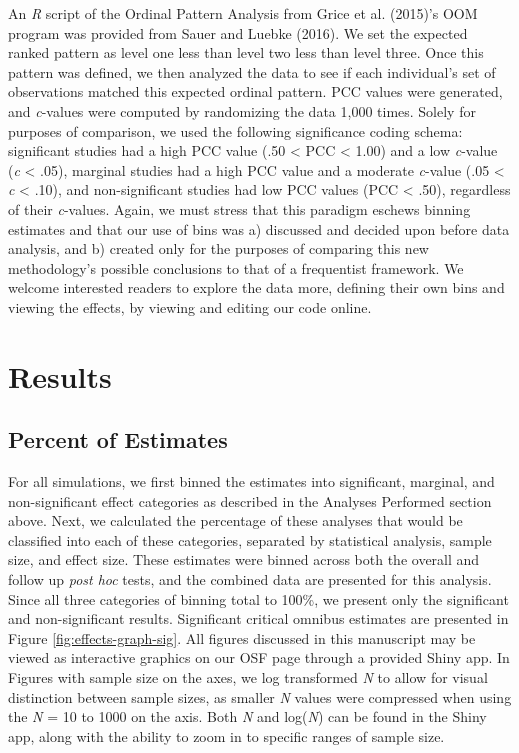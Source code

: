 \documentclass[,man, mask]{apa6}
\theoremstyle{definition}
\theoremstyle{definition}
\theoremstyle{definition}
\theoremstyle{remark}
\begin{document}
An \emph{R} script of the Ordinal Pattern Analysis from Grice et al.
(2015)'s OOM program was provided from Sauer and Luebke (2016). We set
the expected ranked pattern as level one less than level two less than
level three. Once this pattern was defined, we then analyzed the data to
see if each individual's set of observations matched this expected
ordinal pattern. PCC values were generated, and \emph{c}-values were
computed by randomizing the data 1,000 times. Solely for purposes of
comparison, we used the following significance coding schema:
significant studies had a high PCC value (.50 \textless{} PCC
\textless{} 1.00) and a low \emph{c}-value (\emph{c} \textless{} .05),
marginal studies had a high PCC value and a moderate \emph{c}-value (.05
\textless{} \emph{c} \textless{} .10), and non-significant studies had
low PCC values (PCC \textless{} .50), regardless of their
\emph{c}-values. Again, we must stress that this paradigm eschews
binning estimates and that our use of bins was a) discussed and decided
upon before data analysis, and b) created only for the purposes of
comparing this new methodology's possible conclusions to that of a
frequentist framework. We welcome interested readers to explore the data
more, defining their own bins and viewing the effects, by viewing and
editing our code online.

\section{Results}\label{results}

\subsection{Percent of Estimates}\label{percent-of-estimates}

For all simulations, we first binned the estimates into significant,
marginal, and non-significant effect categories as described in the
Analyses Performed section above. Next, we calculated the percentage of
these analyses that would be classified into each of these categories,
separated by statistical analysis, sample size, and effect size. These
estimates were binned across both the overall and follow up \emph{post
hoc} tests, and the combined data are presented for this analysis. Since
all three categories of binning total to 100\%, we present only the
significant and non-significant results. Significant critical omnibus
estimates are presented in Figure \ref{fig:effects-graph-sig}. All
figures discussed in this manuscript may be viewed as interactive
graphics on our OSF page through a provided Shiny app. In Figures with
sample size on the axes, we log transformed \emph{N} to allow for visual
distinction between sample sizes, as smaller \emph{N} values were
compressed when using the \emph{N} = 10 to 1000 on the axis. Both
\emph{N} and log(\emph{N}) can be found in the Shiny app, along with the
ability to zoom in to specific ranges of sample size.
\end{document}
